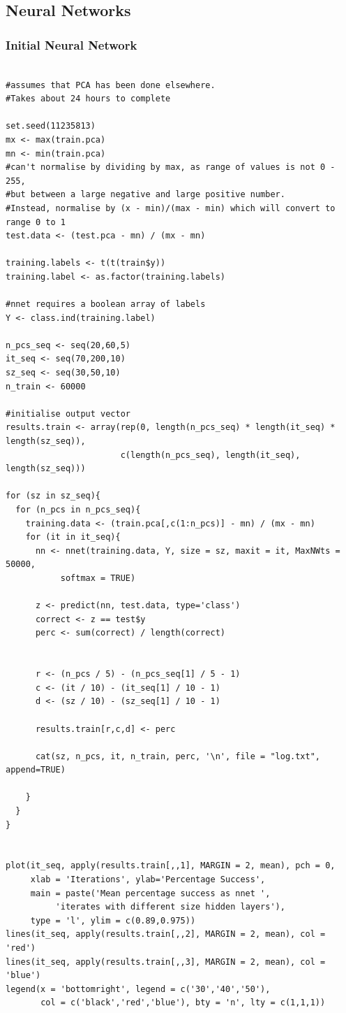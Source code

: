 \documentclass[11pt]{article} %
\begin{document}
\subsection{Neural Networks}
\label{code-nnet}

\subsubsection{Initial Neural Network}
\label{code-init_nnet}
\begin{lstlisting}

#assumes that PCA has been done elsewhere. 
#Takes about 24 hours to complete

set.seed(11235813)
mx <- max(train.pca)
mn <- min(train.pca)
#can't normalise by dividing by max, as range of values is not 0 - 255, 
#but between a large negative and large positive number. 
#Instead, normalise by (x - min)/(max - min) which will convert to range 0 to 1
test.data <- (test.pca - mn) / (mx - mn) 

training.labels <- t(t(train$y))
training.label <- as.factor(training.labels)

#nnet requires a boolean array of labels
Y <- class.ind(training.label)

n_pcs_seq <- seq(20,60,5)
it_seq <- seq(70,200,10)
sz_seq <- seq(30,50,10)
n_train <- 60000

#initialise output vector
results.train <- array(rep(0, length(n_pcs_seq) * length(it_seq) * length(sz_seq)),
                       c(length(n_pcs_seq), length(it_seq), length(sz_seq)))

for (sz in sz_seq){
  for (n_pcs in n_pcs_seq){
    training.data <- (train.pca[,c(1:n_pcs)] - mn) / (mx - mn)
    for (it in it_seq){
      nn <- nnet(training.data, Y, size = sz, maxit = it, MaxNWts = 50000, 
           softmax = TRUE)
      
      z <- predict(nn, test.data, type='class')
      correct <- z == test$y
      perc <- sum(correct) / length(correct)
      
      
      r <- (n_pcs / 5) - (n_pcs_seq[1] / 5 - 1) 
      c <- (it / 10) - (it_seq[1] / 10 - 1)
      d <- (sz / 10) - (sz_seq[1] / 10 - 1)
      
      results.train[r,c,d] <- perc
      
      cat(sz, n_pcs, it, n_train, perc, '\n', file = "log.txt", append=TRUE)
      
    }
  }
}


plot(it_seq, apply(results.train[,,1], MARGIN = 2, mean), pch = 0, 
     xlab = 'Iterations', ylab='Percentage Success', 
     main = paste('Mean percentage success as nnet ', 
          'iterates with different size hidden layers'), 
     type = 'l', ylim = c(0.89,0.975))
lines(it_seq, apply(results.train[,,2], MARGIN = 2, mean), col = 'red')
lines(it_seq, apply(results.train[,,3], MARGIN = 2, mean), col = 'blue')
legend(x = 'bottomright', legend = c('30','40','50'), 
       col = c('black','red','blue'), bty = 'n', lty = c(1,1,1))


\end{lstlisting}
\end{document}
